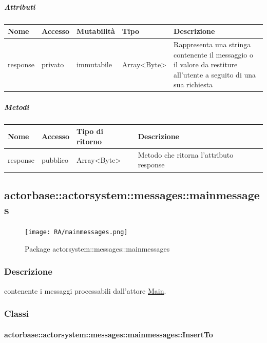 \documentclass{scalatekids-article}
\begin{document}
\subparagraph{Attributi}
\begin{tabular}{| p{2cm} | p{1.5cm} | p{2cm} | p{3cm} | p{8.5cm} |}
  \hline
  Nome & Accesso & Mutabilità & Tipo & Descrizione\\
  \hline
  response & privato & immutabile & Array<Byte> & Rappresenta una stringa contenente il messaggio o il valore da restiture all'utente a seguito di una sua richiesta\\
  \hline
\end{tabular}

\subparagraph{Metodi}
\begin{tabular}{| p{3cm} | p{1.5cm} | p{3.5cm} | p{9cm} |}
  \hline
  Nome & Accesso & Tipo di ritorno & Descrizione\\
  \hline
  response & pubblico & Array<Byte> & Metodo che ritorna l'attributo response\\
  \hline
\end{tabular}


\subsection{actorbase::actorsystem::messages::mainmessages}
\label{sec:actorbase::actorsystem::messages::mainmessages}

\begin{figure}[H]
  \begin{center}
    \texttt{[image: RA/mainmessages.png]}
    \caption{Package actorsystem::messages::mainmessages}
  \end{center}
\end{figure}

\subsubsection{Descrizione}
 contenente i messaggi processabili dall'attore \hyperref[sec:actorbase::actorsystem::actors::main::Main]{Main}.

\subsubsection{Classi}

\paragraph{actorbase::actorsystem::messages::mainmessages::InsertTo}
\label{sec:actorbase::actorsystem::messages::mainmessages::InsertTo}
\end{document}
